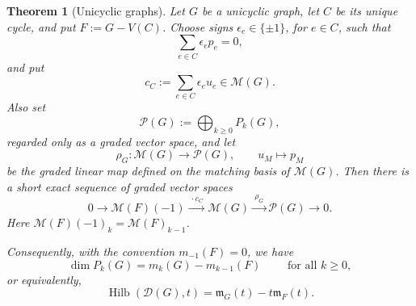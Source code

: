 \documentclass[12pt]{amsart}
\newtheorem{theorem}{Theorem}[section]
\theoremstyle{definition}
\theoremstyle{remark}
\newcommand{\Hilb}{\operatorname{Hilb}}
\begin{document}
\begin{theorem}[Unicyclic graphs]\label{thm:unicyclic-hilbert}
Let $G$ be a unicyclic graph, let $C$ be its unique cycle, and put
$F:=G-V(C)$.  Choose signs $\epsilon_e\in\{\pm1\}$, for $e\in C$, such that
\[
 \sum_{e\in C}\epsilon_e p_e=0,
\]
and put
\[
 c_C:=\sum_{e\in C}\epsilon_e u_e\in\mathcal M(G).
\]
Also set
\[
 \mathcal P(G):=\bigoplus_{k\geq0}P_k(G),
\]
regarded only as a graded vector space, and let
\[
 \rho_G:\mathcal M(G)\longrightarrow\mathcal P(G),
 \qquad
 u_M\longmapsto p_M
\]
be the graded linear map defined on the matching basis of $\mathcal M(G)$.
Then there is a short exact sequence of graded vector spaces
\begin{equation}\label{eq:unicyclic-exact-sequence}
 0\longrightarrow \mathcal M(F)(-1)
 \xrightarrow{\ \cdot c_C\ }
 \mathcal M(G)
 \xrightarrow{\ \rho_G\ }
 \mathcal P(G)
 \longrightarrow0.
\end{equation}
Here $\mathcal M(F)(-1)_k=\mathcal M(F)_{k-1}$.

Consequently, with the convention $m_{-1}(F)=0$, we have
\[
 \dim P_k(G)=m_k(G)-m_{k-1}(F)
 \qquad \text{ for all }k\geq0,
\]
or equivalently,
\[
 \Hilb(\mathcal D(G),t)=\mathfrak m_G(t)-t\mathfrak m_F(t).
\]
\end{theorem}
\end{document}
